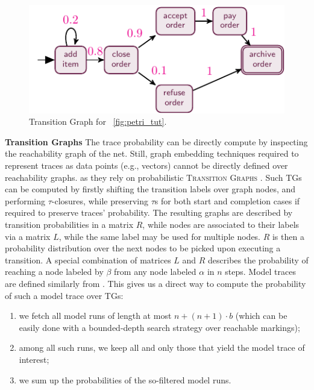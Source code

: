 \begin{figure}[!t]
	\centering
	\includegraphics[width=.4\textwidth]{images/besser_rg}
	\caption{Transition Graph for \figurename~\ref{fig:petri_tut}.}
\end{figure}
\medskip
\noindent
\textbf{Transition Graphs} The trace probability can be directly compute by inspecting the reachability graph of the net. Still, graph embedding techniques required to represent traces as data points (e.g., vectors) 
cannot be directly defined over reachability graphs. as they %
rely on probabilistic \textsc{Transition Graphs} \cite{GartnerFW03}.  Such TGs can be computed by firstly shifting the transition labels over graph nodes, and performing $\tau$-closures, while preserving $\tau$s for both start and completion cases if required to preserve traces' probability. The resulting  graphs are described by transition probabilities in a matrix $R$, while nodes are associated to their labels via a matrix $L$, while the same label may be used for multiple nodes. $R$ is then a probability distribution over the next nodes to be picked upon executing a transition.
A special combination of matrices $L$ and $R$ \cite{GartnerFW03} describes the probability of reaching a node labeled by $\beta$ from any node labeled $\alpha$ in $n$ steps. Model traces  are defined similarly from . This gives us a direct way to compute the probability of such a model trace over TGs:
\begin{enumerate}
	\item  we fetch all model runs of length at most $n+(n+1)\cdot b$ (which can be easily done with a bounded-depth search strategy over reachable markings);
	\item among all such runs, we keep all and only those that yield the model trace of interest;
	\item we sum up the probabilities of the so-filtered model runs.
\end{enumerate}



